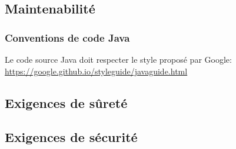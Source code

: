 \subsection{Maintenabilité}
	

\subsubsection{Conventions de code Java}

\begin{requirement}
	Le code source Java doit respecter le style proposé par Google:\\
\url{https://google.github.io/styleguide/javaguide.html}
\end{requirement}



	\subsection{Exigences de sûreté}

	\subsection{Exigences de sécurité}

